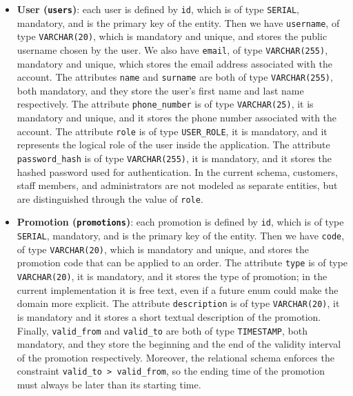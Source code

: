 \begin{itemize}
    \item \textbf{User (\texttt{users})}: each user is defined by \texttt{id}, which is of type \texttt{SERIAL}, mandatory, and is the primary key of the entity. Then we have \texttt{username}, of type \texttt{VARCHAR(20)}, which is mandatory and unique, and stores the public username chosen by the user. We also have \texttt{email}, of type \texttt{VARCHAR(255)}, mandatory and unique, which stores the email address associated with the account. The attributes \texttt{name} and \texttt{surname} are both of type \texttt{VARCHAR(255)}, both mandatory, and they store the user's first name and last name respectively. The attribute \texttt{phone\_number} is of type \texttt{VARCHAR(25)}, it is mandatory and unique, and it stores the phone number associated with the account. The attribute \texttt{role} is of type \texttt{USER\_ROLE}, it is mandatory, and it represents the logical role of the user inside the application. The attribute \texttt{password\_hash} is of type \texttt{VARCHAR(255)}, it is mandatory, and it stores the hashed password used for authentication. In the current schema, customers, staff members, and administrators are not modeled as separate entities, but are distinguished through the value of \texttt{role}.
    \item \textbf{Promotion (\texttt{promotions})}: each promotion is defined by \texttt{id}, which is of type \texttt{SERIAL}, mandatory, and is the primary key of the entity. Then we have \texttt{code}, of type \texttt{VARCHAR(20)}, which is mandatory and unique, and stores the promotion code that can be applied to an order. The attribute \texttt{type} is of type \texttt{VARCHAR(20)}, it is mandatory, and it stores the type of promotion; in the current implementation it is free text, even if a future enum could make the domain more explicit. The attribute \texttt{description} is of type \texttt{VARCHAR(20)}, it is mandatory and it stores a short textual description of the promotion. Finally, \texttt{valid\_from} and \texttt{valid\_to} are both of type \texttt{TIMESTAMP}, both mandatory, and they store the beginning and the end of the validity interval of the promotion respectively. Moreover, the relational schema enforces the constraint \texttt{valid\_to > valid\_from}, so the ending time of the promotion must always be later than its starting time.


\end{itemize}
